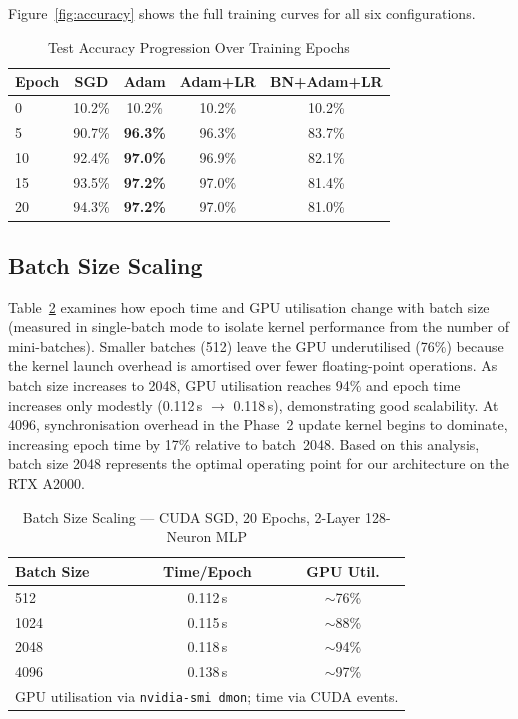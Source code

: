\documentclass[conference]{IEEEtran}
\begin{document}
Figure~\ref{fig:accuracy} shows the full training curves for all six configurations.

\begin{table}[htbp]
\caption{Test Accuracy Progression Over Training Epochs}
\begin{center}
\begin{tabular}{lcccc}
\toprule
\textbf{Epoch} & \textbf{SGD} & \textbf{Adam} & \textbf{Adam+LR} & \textbf{BN+Adam+LR}\\
\midrule
0  & 10.2\% & 10.2\% & 10.2\% & 10.2\% \\
5  & 90.7\% & \textbf{96.3\%} & 96.3\% & 83.7\% \\
10 & 92.4\% & \textbf{97.0\%} & 96.9\% & 82.1\% \\
15 & 93.5\% & \textbf{97.2\%} & 97.0\% & 81.4\% \\
20 & 94.3\% & \textbf{97.2\%} & 97.0\% & 81.0\% \\
\bottomrule
\end{tabular}
\label{tab:convergence}
\end{center}
\end{table}

\subsection{Batch Size Scaling}

Table~\ref{tab:batchsize} examines how epoch time and GPU utilisation change with batch size (measured in single-batch mode to isolate kernel performance from the number of mini-batches). Smaller batches (512) leave the GPU underutilised (76\%) because the kernel launch overhead is amortised over fewer floating-point operations. As batch size increases to 2048, GPU utilisation reaches 94\% and epoch time increases only modestly (0.112\,s $\to$ 0.118\,s), demonstrating good scalability. At 4096, synchronisation overhead in the Phase~2 update kernel begins to dominate, increasing epoch time by 17\% relative to batch~2048. Based on this analysis, batch size 2048 represents the optimal operating point for our architecture on the RTX A2000.

\begin{table}[htbp]
\caption{Batch Size Scaling — CUDA SGD, 20 Epochs, 2-Layer 128-Neuron MLP}
\begin{center}
\begin{tabular}{lcc}
\toprule
\textbf{Batch Size} & \textbf{Time/Epoch} & \textbf{GPU Util.}\\
\midrule
512  & 0.112\,s & $\sim$76\% \\
1024 & 0.115\,s & $\sim$88\% \\
2048 & 0.118\,s & $\sim$94\% \\
4096 & 0.138\,s & $\sim$97\% \\
\midrule
\multicolumn{3}{l}{\small GPU utilisation via \texttt{nvidia-smi dmon}; time via CUDA events.}\\
\bottomrule
\end{tabular}
\label{tab:batchsize}
\end{center}
\end{table}
\end{document}
